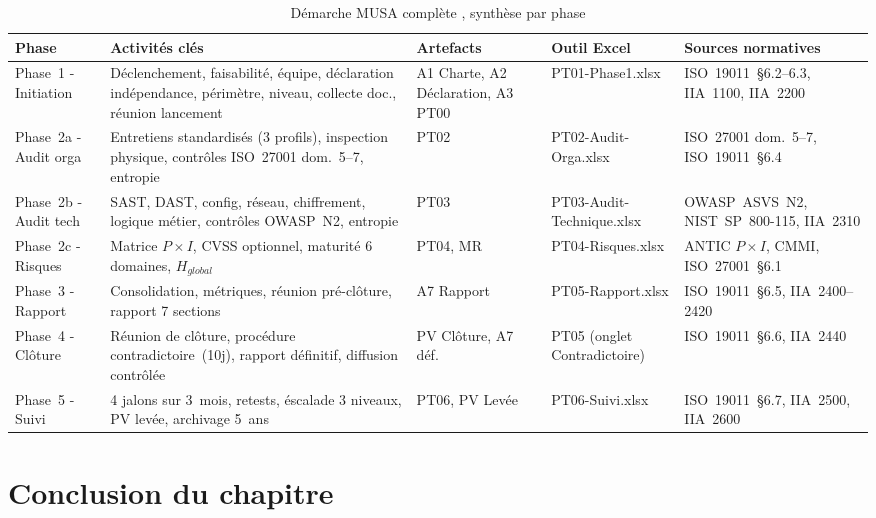 \documentclass[12pt,a4paper,oneside]{report}
\begin{document}
\begin{table}[H]
\centering\small
\caption{D\'emarche MUSA compl\`ete , synth\`ese par phase}
\label{tab:musa_synthese}
\begin{tabularx}{\textwidth}{p{2cm}p{4cm}p{2.5cm}p{2.5cm}X}
\toprule
\rowcolor{theadcolor}
\color{white}\textbf{Phase} &
\color{white}\textbf{Activit\'es cl\'es} &
\color{white}\textbf{Artefacts} &
\color{white}\textbf{Outil Excel} &
\color{white}\textbf{Sources normatives} \\
\midrule
Phase~1 - Initiation &
  D\'eclenchement, faisabilit\'e, \'equipe, d\'eclaration ind\'ependance,
  p\'erim\`etre, niveau, collecte doc., r\'eunion lancement &
  A1 Charte, A2 D\'eclaration, A3 PT00 &
  PT01-Phase1.xlsx &
  ISO~19011~§6.2--6.3, IIA~1100, IIA~2200 \\
Phase~2a - Audit orga &
  Entretiens standardis\'es (3 profils), inspection physique,
  contr\^oles ISO~27001 dom.~5--7, entropie &
  PT02 &
  PT02-Audit-Orga.xlsx &
  ISO~27001 dom.~5--7, ISO~19011~§6.4 \\
Phase~2b - Audit tech &
  SAST, DAST, config, r\'eseau, chiffrement, logique m\'etier,
  contr\^oles OWASP~N2, entropie &
  PT03 &
  PT03-Audit-Technique.xlsx &
  OWASP~ASVS~N2, NIST~SP~800-115, IIA~2310 \\
Phase~2c - Risques &
  Matrice $P\times I$, CVSS optionnel, maturit\'e 6 domaines,
  $H_{global}$ &
  PT04, MR &
  PT04-Risques.xlsx &
  ANTIC $P\times I$, CMMI, ISO~27001~§6.1 \\
Phase~3 - Rapport &
  Consolidation, m\'etriques, r\'eunion pr\'e-cl\^oture,
  rapport 7 sections &
  A7 Rapport &
  PT05-Rapport.xlsx &
  ISO~19011~§6.5, IIA~2400--2420 \\
Phase~4 - Cl\^oture &
  R\'eunion de cl\^oture, proc\'edure contradictoire~(10j),
  rapport d\'efinitif, diffusion contr\^ol\'ee &
  PV Cl\^oture, A7 d\'ef. &
  PT05 (onglet Contradictoire) &
  ISO~19011~§6.6, IIA~2440 \\
Phase~5 - Suivi &
  4 jalons sur 3~mois, retests, \'escalade 3 niveaux,
  PV lev\'ee, archivage 5~ans &
  PT06, PV Lev\'ee &
  PT06-Suivi.xlsx &
  ISO~19011~§6.7, IIA~2500, IIA~2600 \\
\bottomrule
\end{tabularx}
\end{table}

\section*{Conclusion du chapitre}
\end{document}
